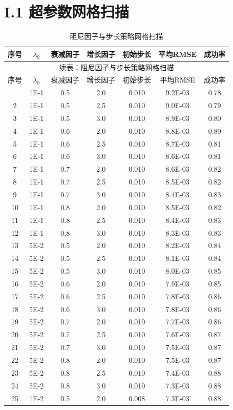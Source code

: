 \section*{I.1 超参数网格扫描}
{
\scriptsize
\begin{longtable}{ccccccc}
\caption{阻尼因子与步长策略网格扫描}\\
\toprule
序号 & $\lambda_0$ & 衰减因子 & 增长因子 & 初始步长 & 平均RMSE & 成功率\\
\midrule
\endfirsthead
\multicolumn{7}{c}{续表：阻尼因子与步长策略网格扫描}\\
\toprule
序号 & $\lambda_0$ & 衰减因子 & 增长因子 & 初始步长 & 平均RMSE & 成功率\\
\midrule
\endhead
\bottomrule
\endfoot
1&1E-1&0.5&2.0&0.010&9.2E-03&0.78\\
2&1E-1&0.5&2.5&0.010&9.0E-03&0.79\\
3&1E-1&0.5&3.0&0.010&8.9E-03&0.80\\
4&1E-1&0.6&2.0&0.010&8.8E-03&0.80\\
5&1E-1&0.6&2.5&0.010&8.7E-03&0.81\\
6&1E-1&0.6&3.0&0.010&8.6E-03&0.81\\
7&1E-1&0.7&2.0&0.010&8.6E-03&0.82\\
8&1E-1&0.7&2.5&0.010&8.5E-03&0.82\\
9&1E-1&0.7&3.0&0.010&8.4E-03&0.83\\
10&1E-1&0.8&2.0&0.010&8.5E-03&0.82\\
11&1E-1&0.8&2.5&0.010&8.4E-03&0.83\\
12&1E-1&0.8&3.0&0.010&8.3E-03&0.83\\
13&5E-2&0.5&2.0&0.010&8.2E-03&0.84\\
14&5E-2&0.5&2.5&0.010&8.1E-03&0.84\\
15&5E-2&0.5&3.0&0.010&8.0E-03&0.85\\
16&5E-2&0.6&2.0&0.010&7.9E-03&0.85\\
17&5E-2&0.6&2.5&0.010&7.8E-03&0.86\\
18&5E-2&0.6&3.0&0.010&7.8E-03&0.86\\
19&5E-2&0.7&2.0&0.010&7.7E-03&0.86\\
20&5E-2&0.7&2.5&0.010&7.6E-03&0.87\\
21&5E-2&0.7&3.0&0.010&7.5E-03&0.87\\
22&5E-2&0.8&2.0&0.010&7.5E-03&0.87\\
23&5E-2&0.8&2.5&0.010&7.4E-03&0.88\\
24&5E-2&0.8&3.0&0.010&7.3E-03&0.88\\
25&1E-2&0.5&2.0&0.008&7.3E-03&0.88\\

\end{longtable}}
